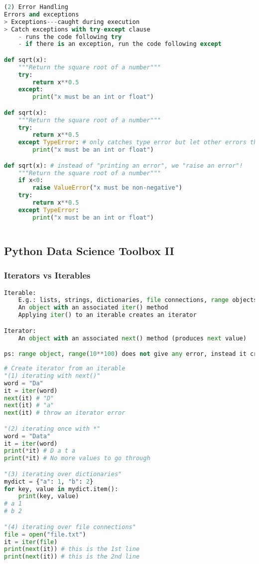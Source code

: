 \documentclass[12pt]{article}
\begin{document}
\begin{lstlisting}[language=Python]
(2) Error Handling
Errors and exceptions
> Exceptions---caught during execution
> Catch exceptions with try-except clause
    - runs the code following try
    - if there is an exception, run the code following except

def sqrt(x):
    """Return the square root of a number"""
    try: 
        return x**0.5
    except:
        print("x must be an int or float")

def sqrt(x):
    """Return the square root of a number"""
    try:
        return x**0.5
    except TypeError: # only catches type error but let other errors through
        print("x must be an int or float")

def sqrt(x): # instead of "printing an error", we "raise an error"!
    """Return the square root of a number"""
    if x<0:
        raise ValueError("x must be non-negative")
    try:
        return x**0.5
    except TypeError:
        print("x must be an int or float")
    
\end{lstlisting}

\newpage
\subsection{\large Python Data Science Toolbox II}
\subsubsection{\normalsize Iterators vs Iterables}
\begin{lstlisting}[language=Python]
Iterable:
    E.g.: lists, strings, dictionaries, file connections, range objects
    An object with an associated iter() method
    Applying iter() to an iterable creates an iterator

Iterator:
    An object with an associated next() method (produces next value)

ps: range object, range(10**100) does not give any error, instead it creates a range object but does not precreate a list object.
\end{lstlisting}

\begin{lstlisting}[language=Python]
# Create iterator from an iterable
"(1) iterating with next()"
word = "Da"
it = iter(word)
next(it) # "D"
next(it) # "a"
next(it) # throw an iterator error

"(2) iterating once with *"
word = "Data"
it = iter(word)
print(*it) # D a t a
print(*it) # No more values to go through

"(3) iterating over dictionaries"
mydict = {"a": 1, "b": 2}
for key, value in mydict.item():
    print(key, value)
# a 1
# b 2

"(4) iterating over file connections"
file = open("file.txt")
it = iter(file)
print(next(it)) # this is the 1st line
print(next(it)) # this is the 2nd line
\end{lstlisting}
\end{document}
